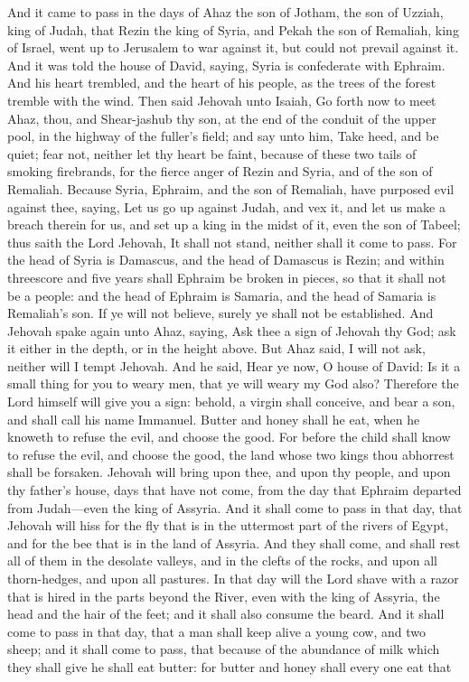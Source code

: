 And it came to pass in the days of Ahaz the son of Jotham, the son of Uzziah, king of Judah, that Rezin the king of Syria, and Pekah the son of Remaliah, king of Israel, went up to Jerusalem to war against it, but could not prevail against it. And it was told the house of David, saying, Syria is confederate with Ephraim. And his heart trembled, and the heart of his people, as the trees of the forest tremble with the wind.  Then said Jehovah unto Isaiah, Go forth now to meet Ahaz, thou, and Shear-jashub thy son, at the end of the conduit of the upper pool, in the highway of the fuller’s field; and say unto him, Take heed, and be quiet; fear not, neither let thy heart be faint, because of these two tails of smoking firebrands, for the fierce anger of Rezin and Syria, and of the son of Remaliah. Because Syria, Ephraim, and the son of Remaliah, have purposed evil against thee, saying, Let us go up against Judah, and vex it, and let us make a breach therein for us, and set up a king in the midst of it, even the son of Tabeel; thus saith the Lord Jehovah, It shall not stand, neither shall it come to pass. For the head of Syria is Damascus, and the head of Damascus is Rezin; and within threescore and five years shall Ephraim be broken in pieces, so that it shall not be a people: and the head of Ephraim is Samaria, and the head of Samaria is Remaliah’s son. If ye will not believe, surely ye shall not be established.  And Jehovah spake again unto Ahaz, saying, Ask thee a sign of Jehovah thy God; ask it either in the depth, or in the height above. But Ahaz said, I will not ask, neither will I tempt Jehovah. And he said, Hear ye now, O house of David: Is it a small thing for you to weary men, that ye will weary my God also? Therefore the Lord himself will give you a sign: behold, a virgin shall conceive, and bear a son, and shall call his name Immanuel. Butter and honey shall he eat, when he knoweth to refuse the evil, and choose the good. For before the child shall know to refuse the evil, and choose the good, the land whose two kings thou abhorrest shall be forsaken. Jehovah will bring upon thee, and upon thy people, and upon thy father’s house, days that have not come, from the day that Ephraim departed from Judah—even the king of Assyria.  And it shall come to pass in that day, that Jehovah will hiss for the fly that is in the uttermost part of the rivers of Egypt, and for the bee that is in the land of Assyria. And they shall come, and shall rest all of them in the desolate valleys, and in the clefts of the rocks, and upon all thorn-hedges, and upon all pastures.  In that day will the Lord shave with a razor that is hired in the parts beyond the River, even with the king of Assyria, the head and the hair of the feet; and it shall also consume the beard.  And it shall come to pass in that day, that a man shall keep alive a young cow, and two sheep; and it shall come to pass, that because of the abundance of milk which they shall give he shall eat butter: for butter and honey shall every one eat that 